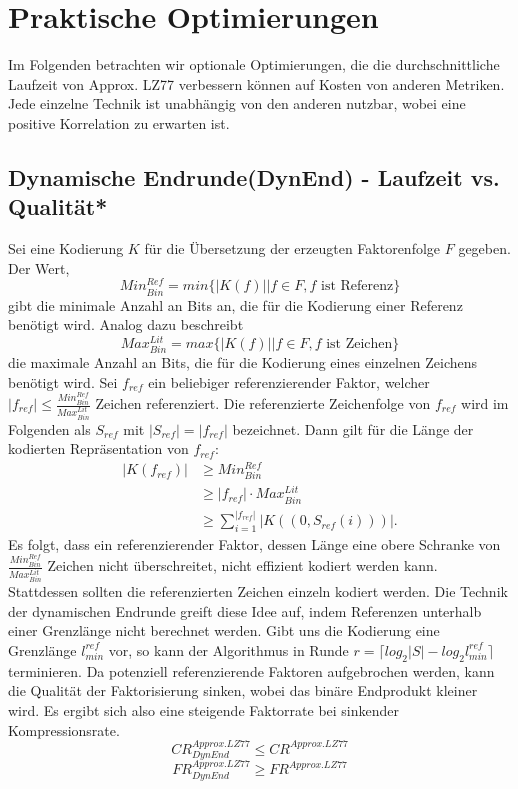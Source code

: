 \section{Praktische Optimierungen}
Im Folgenden betrachten wir optionale Optimierungen, die die durchschnittliche Laufzeit von Approx. LZ77 verbessern können auf Kosten von anderen Metriken. Jede einzelne Technik ist unabhängig von
den anderen nutzbar, wobei eine positive Korrelation zu erwarten ist.

\subsection{Dynamische Endrunde(DynEnd) - Laufzeit vs. Qualität*}
Sei eine Kodierung $K$ für die Übersetzung der erzeugten Faktorenfolge $F$ gegeben. Der Wert,
\begin{equation}
    Min^{Ref}_{Bin}=min\{|K(f)| | f \in F ,f \text{ ist Referenz}\}
\end{equation}
gibt die minimale Anzahl an Bits an, die für die Kodierung einer Referenz benötigt wird. Analog dazu beschreibt
\begin{equation}
    Max^{Lit}_{Bin}=max\{|K(f)| | f \in F, f \text{ ist Zeichen}\}
\end{equation}
die maximale Anzahl an Bits, die für die Kodierung eines einzelnen Zeichens benötigt wird. Sei $f_{ref}$ ein beliebiger referenzierender Faktor, welcher 
$|f_{ref}|\leq\frac{Min^{Ref}_{Bin}}{Max^{Lit}_{Bin}}$ Zeichen referenziert. Die referenzierte Zeichenfolge von $f_{ref}$ wird im Folgenden als $S_{ref}$ mit $|S_{ref}|=|f_{ref}|$ bezeichnet.
Dann gilt für die Länge der kodierten Repräsentation von $f_{ref}$:
\begin{equation}
\begin{split}
    |K(f_{ref})| & \geq Min^{Ref}_{Bin}\\
    & \geq |f_{ref}| \cdot Max^{Lit}_{Bin}\\
    & \geq \sum_{i=1}^{|f_{ref}|} |K((0, S_{ref}(i)))|.
\end{split}
\end{equation}
Es folgt, dass ein referenzierender Faktor, dessen Länge eine obere Schranke von $\frac{Min^{Ref}_{Bin}}{Max^{Lit}_{Bin}}$ Zeichen nicht überschreitet, nicht effizient kodiert werden kann.
Stattdessen sollten die referenzierten Zeichen einzeln kodiert werden. Die Technik der dynamischen Endrunde greift diese Idee auf, indem Referenzen unterhalb einer Grenzlänge nicht berechnet
werden. Gibt uns die Kodierung eine Grenzlänge $l^{ref}_{min}$ vor, so kann der Algorithmus in Runde $r = \lceil log_2{|S|}-log_2{l^{ref}_{min}} \rceil$ terminieren. Da potenziell 
referenzierende Faktoren aufgebrochen werden, kann die Qualität der Faktorisierung sinken, wobei das binäre Endprodukt kleiner wird. Es ergibt sich also eine steigende Faktorrate bei
sinkender Kompressionsrate.
\begin{equation}
    CR^{Approx.LZ77}_{DynEnd} \leq CR^{Approx.LZ77}
\end{equation}
\begin{equation}
    FR^{Approx.LZ77}_{DynEnd} \geq FR^{Approx.LZ77}
\end{equation}

